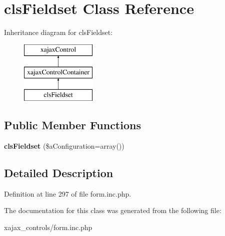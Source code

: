 \hypertarget{classclsFieldset}{
\section{clsFieldset Class Reference}
\label{classclsFieldset}
}
Inheritance diagram for clsFieldset:\begin{figure}[H]
\begin{center}
\leavevmode
\includegraphics[height=3.000000cm]{classclsFieldset}
\end{center}
\end{figure}
\subsection*{Public Member Functions}
\begin{DoxyCompactItemize}
\item 
\hypertarget{classclsFieldset_a0ac441594dd63874416d1fc87fd37f8d}{
{\bfseries clsFieldset} (\$aConfiguration=array())}
\label{classclsFieldset_a0ac441594dd63874416d1fc87fd37f8d}

\end{DoxyCompactItemize}


\subsection{Detailed Description}


Definition at line 297 of file form.inc.php.



The documentation for this class was generated from the following file:\begin{DoxyCompactItemize}
\item 
xajax\_\-controls/form.inc.php\end{DoxyCompactItemize}
